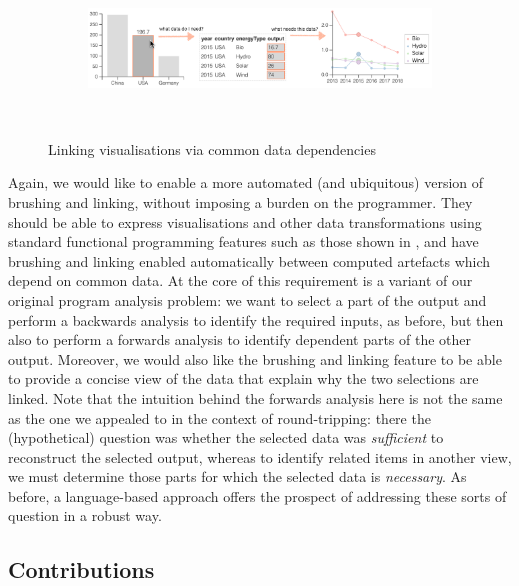 \begin{figure}
  \begin{subfigure}[b]{0.99\textwidth}
     \centering
     {\includegraphics[scale=0.58]{fig/example/vis-linking.png}}
  \end{subfigure}\\[2mm]
  \begin{subfigure}{0.8\textwidth}
     \small
     
  \end{subfigure}
 \caption{Linking visualisations via common data dependencies}
 \label{fig:introduction:vis-linking}
\end{figure}

Again, we would like to enable a more automated (and ubiquitous) version of brushing and linking, without imposing a burden on the programmer. They should be able to express visualisations and other data transformations using standard functional programming features such as those shown in , and have brushing and linking enabled automatically between computed artefacts which depend on common data. At the core of this requirement is a variant of our original program analysis problem: we want to select a part of the output and perform a backwards analysis to identify the required inputs, as before, but then also to perform a forwards analysis to identify dependent parts of the other output. Moreover, we would also like the brushing and linking feature to be able to provide a concise view of the data that explain why the two selections are linked. Note that the intuition behind the forwards analysis here is not the same as the one we appealed to in the context of round-tripping: there the (hypothetical) question was whether the selected data was \emph{sufficient} to reconstruct the selected output, whereas to identify related items in another view, we must determine those parts for which the selected data is \emph{necessary}. As before, a language-based approach offers the prospect of addressing these sorts of question in a robust way.

\subsection{Contributions}

